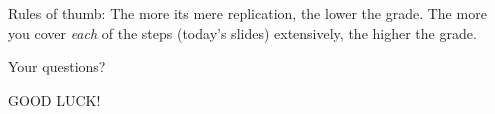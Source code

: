 \begin{frame}[standout]
Rules of thumb: The more its mere replication, the lower the grade. The more you cover \emph{each} of the steps (today's slides) extensively, the higher the grade.

\end{frame}





\begin{frame}[standout]
Your questions?
\end{frame}





\begin{frame}[standout]
GOOD LUCK!
\end{frame}





\begin{frame}
\printbibliography
\end{frame}




